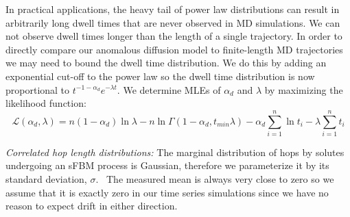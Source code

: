 \documentclass{article}
\begin{document}
  In practical applications, the heavy tail of power law distributions can result in 
  arbitrarily long dwell times that are never observed in MD simulations. We can not
  observe dwell times longer than the length of a single trajectory. 
  In order to directly compare our anomalous diffusion model to finite-length MD 
  trajectories we may need to bound the dwell time distribution. We do this by adding 
  an exponential cut-off to the power law so the dwell time distribution is 
  now proportional to $t^{-1 - \alpha_d}e^{-\lambda t}$.
  We determine MLEs of $\alpha_d$ and $\lambda$ by maximizing the likelihood function:~\cite{clauset_power-law_2009}
  \begin{equation}
    \mathcal{L}(\alpha_d, \lambda) = n(1 - \alpha_d)\ln\lambda - n\ln\Gamma(1 - \alpha_d, t_{min}\lambda) - \alpha_d\sum_{i=1}^{n}\ln t_i - \lambda\sum_{i=1}^n t_i
  \label{eqn:powerlaw_cutoff_likelihood}
  \end{equation}
  
  \textit{Correlated hop length distributions:} The marginal distribution of hops by solutes 
  undergoing an sFBM process is Gaussian, therefore we parameterize it by its standard deviation, 
  $\sigma$.~\cite{metzler_random_2000, metzler_anomalous_2014,neusius_subdiffusion_2009}
  The measured mean is always very close to zero so we assume that it is exactly zero
  in our time series simulations since we have no reason to expect drift in either direction.
\end{document}
